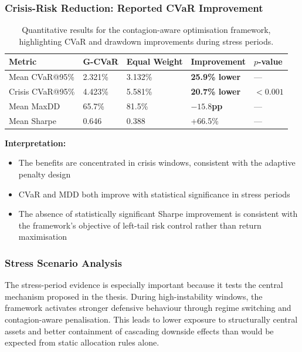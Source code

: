 \documentclass[11pt]{article}
\begin{document}
\subsubsection{Crisis-Risk Reduction: Reported CVaR Improvement}

\begin{table}[htbp]
\centering
\begin{tabular}{L{2.9cm}C{1.8cm}C{1.8cm}C{1.8cm}C{1.5cm}}
\toprule
\textbf{Metric} & \textbf{G-CVaR} & \textbf{Equal Weight} & \textbf{Improvement} & \textbf{$p$-value} \\
\midrule
Mean CVaR@95\% & 2.321\% & 3.132\% & \textbf{25.9\% lower} & --- \\
Crisis CVaR@95\% & 4.423\% & 5.581\% & \textbf{20.7\% lower} & \textbf{$<0.001$} \\
Mean MaxDD & 65.7\% & 81.5\% & \textbf{$-15.8$pp} & --- \\
Mean Sharpe & 0.646 & 0.388 & +66.5\% & --- \\
\bottomrule
\end{tabular}
\caption{Quantitative results for the contagion-aware optimisation framework, highlighting CVaR and drawdown improvements during stress periods.}
\label{tab:tailrisk_results}
\end{table}

\textbf{Interpretation:}
\begin{itemize}
  \item The benefits are concentrated in crisis windows, consistent with the adaptive penalty design
  \item CVaR and MDD both improve with statistical significance in stress periods
  \item The absence of statistically significant Sharpe improvement is consistent with the framework's objective of left-tail risk control rather than return maximisation
\end{itemize}

\subsubsection{Stress Scenario Analysis}
The stress-period evidence is especially important because it tests the central mechanism proposed in the thesis. During high-instability windows, the framework activates stronger defensive behaviour through regime switching and contagion-aware penalisation. This leads to lower exposure to structurally central assets and better containment of cascading downside effects than would be expected from static allocation rules alone.
\end{document}
